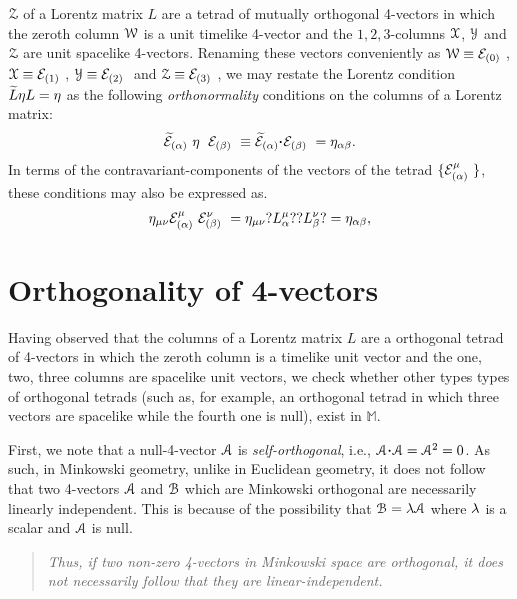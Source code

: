 $\EuScript{Z}$ of a Lorentz matrix $L$ are a tetrad of 
mutually orthogonal  4-vectors in which the zeroth 
column $\EuScript{W}$ is a unit timelike 4-vector and 
the $1, 2, 3$-columns $\EuScript{X}$, $\EuScript{Y}$ 
and $ \EuScript{Z}$ are unit spacelike 4-vectors. 
Renaming these vectors conveniently as 
$\EuScript{W}\equiv\mathcal{E}_{ {({0})}\ } $, $\EuScript{X}\equiv\mathcal{E}_{ {({1})}\ }$, 
$\EuScript{Y}\equiv\mathcal{E}_{ {({2})}\ }$ and 
$\EuScript{Z}\equiv\mathcal{E}_{ {({3})}\ }$,  
we may restate the Lorentz condition $\widetilde{L}{\eta} L= 
{\eta}$ as the following  \textsl{orthonormality} 
conditions on the columns of a Lorentz matrix:
\begin{align}\label{geom.3}
\tdtet{\gka} \gky\hs\dtet{\gkb} \equiv
\tdtet{\gka}\hsn\dotp \dtet{\gkb} =\gky_{\gka\gkb}.
\end{align}
In terms of the contravariant-components of the 
vectors of the tetrad $\{\mathcal{E}_{ {({{\alpha}})}\ }^{{\mu}}\}$,  these 
conditions may also be expressed as.
\begin{align}\label{geom.4}
{\eta}_{{\mu}{\nu}}\mathcal{E}_{ {({{\alpha}})}\ }^{{\mu}}
\mathcal{E}_{ {({{\beta}})}\ }^\nu ={\eta}_{{\mu}{\nu}}?L^{{\mu}}_{{\alpha}}?
 ?L^{{\nu}}_{{\beta}}?={\eta}_{{\alpha}{\beta}},
\end{align}

\section{Orthogonality of 4-vectors}
 Having 
observed that the columns of a Lorentz matrix $L$ are a 
orthogonal tetrad of 4-vectors in which the zeroth 
column is a timelike unit vector and the one, two, 
three columns are spacelike unit vectors, we check 
whether other types types of orthogonal tetrads (such 
as, for example, an orthogonal tetrad in which three 
vectors are spacelike while the fourth one is null), 
exist in $\mathbb{M}$.

First, we note that a null-4-vector $\EuScript{A}$ is 
\textsl{self-orthogonal}, i.e., $\EuScript{A}\dotp 
\EuScript{A} =\EuScript{A}^2 = 0$. As such, in 
Minkowski geometry, unlike in Euclidean geometry, it 
does not follow that two 4-vectors $\EuScript{A}$ and 
$\EuScript{\EuScript{B}}$ which are Minkowski 
orthogonal are necessarily linearly independent. This 
is because of the possibility that $\EuScript{B} ={\lambda} 
\EuScript{A}$ where ${\lambda} $ is a scalar and 
$\EuScript{A}$ is null.
\begin{quote}
\textit{Thus, if two non-zero 4-vectors in Minkowski 
space are orthogonal, it does not necessarily follow 
that they are linear-independent.}
\end{quote} 


